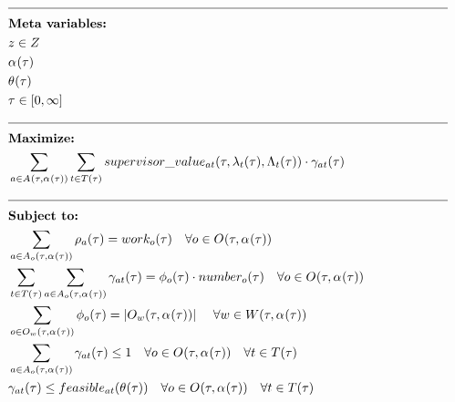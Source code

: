 

\newpage
\begin{alignat}{2}
	& \text{\rule{\linewidth}{0.4pt}} \notag\\
	& \textbf{Meta variables:} \notag\\
	& \ElementSupervisor \in \SetSupervisor \\
	& \VarStrategicWorkOrderAssignment{}{} \\
	& \VarIncludeActivity{} \\
	& \tau \in [0, \infty] \\
	& \text{\rule{\linewidth}{0.4pt}} \notag\\
	& \textbf{Maximize:} \notag\\
	& \sum_{\ElementActivity \in \SetActivity{\VarStrategicWorkOrderAssignment{}{}}{}} \sum_{\ElementTechnician \in \SetTechnician} \ParSupervisorValue \cdot \VarSupervisorAssignment{\ElementActivity}{\ElementTechnician} \\ 
	& \text{\rule{\linewidth}{0.4pt}} \notag\\
	& \textbf{Subject to:} \notag\\ 
	& \sum_{\ElementActivity \in \SetActivity{\VarStrategicWorkOrderAssignment{}{}}{\ElementOperation}} \VarActivityWork{\ElementActivity} = \ParOperationWork{\ElementOperation}    \quad \forall \ElementOperation \in \SetOperation{}{\VarStrategicWorkOrderAssignment{}{}}\\
	& \sum_{\ElementTechnician \in \SetTechnician} \sum_{\ElementActivity \in \SetActivity{\VarStrategicWorkOrderAssignment{}{}}{\ElementOperation}}\VarSupervisorAssignment{\ElementActivity}{\ElementTechnician} = \VarSupervisorAssignmentWhole \cdot \ParNumberOfPeople  \quad \forall \ElementOperation \in \SetOperation{}{\VarStrategicWorkOrderAssignment{}{}}  \\
	& \sum_{\ElementOperation \in \SetOperation{\ElementWorkOrder}{\VarStrategicWorkOrderAssignment{}{}}} \VarSupervisorAssignmentWhole = |\SetOperation{\ElementWorkOrder}{\VarStrategicWorkOrderAssignment{}{}}| \ \quad \forall \ElementWorkOrder \in \SetWorkOrder{,\VarStrategicWorkOrderAssignment{}{}} \\
	& \sum_{\ElementActivity \in \SetActivity{\VarStrategicWorkOrderAssignment{}{}}{\ElementOperation}} \VarSupervisorAssignment{\ElementActivity}{\ElementTechnician} \leq 1  \quad \forall \ElementOperation \in \SetOperation{}{\VarStrategicWorkOrderAssignment{}{}} \quad \forall \ElementTechnician \in \SetTechnician \\  
	& \VarSupervisorAssignment{\ElementActivity}{\ElementTechnician} \leq \ParFeasible  \quad \forall \ElementOperation \in \SetOperation{}{\VarStrategicWorkOrderAssignment{}{}} \quad \forall \ElementTechnician \in \SetTechnician \\

\end{alignat}
